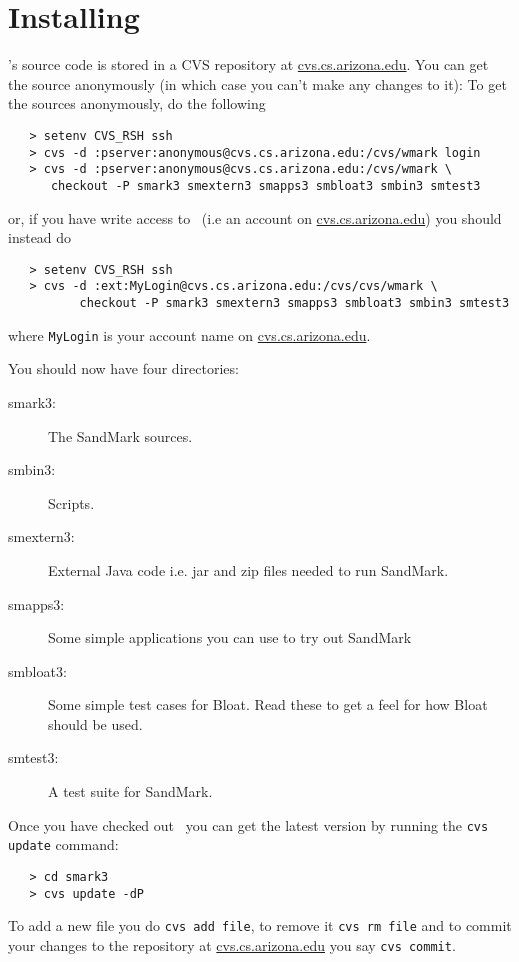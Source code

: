 \section{Installing \SM}
\label{InstallationSection}
\SM's source code is stored in a CVS repository at
\url{cvs.cs.arizona.edu}. You can get the source
anonymously (in which case you can't make
any changes to it):
To get the sources anonymously, do the following
\begin{verbatim}
   > setenv CVS_RSH ssh
   > cvs -d :pserver:anonymous@cvs.cs.arizona.edu:/cvs/wmark login
   > cvs -d :pserver:anonymous@cvs.cs.arizona.edu:/cvs/wmark \
      checkout -P smark3 smextern3 smapps3 smbloat3 smbin3 smtest3
\end{verbatim}
or, if you have write access to \SM\ (i.e an account on 
\url{cvs.cs.arizona.edu}) you should instead do 
\begin{verbatim}
   > setenv CVS_RSH ssh
   > cvs -d :ext:MyLogin@cvs.cs.arizona.edu:/cvs/cvs/wmark \
          checkout -P smark3 smextern3 smapps3 smbloat3 smbin3 smtest3
\end{verbatim}
where {\tt MyLogin} is your account name on \url{cvs.cs.arizona.edu}.

You should now have four directories:
\begin{description}
  \item[smark3:]     The SandMark sources.
  \item[smbin3:]     Scripts.
  \item[smextern3:]  External Java code i.e. jar and zip files
                    needed to run SandMark.
  \item[smapps3:]    Some simple applications you can use to try
                    out SandMark
  \item[smbloat3:]   Some simple test cases for Bloat. Read these
                    to get a feel for how Bloat should be used.
  \item[smtest3:]    A test suite for SandMark.
\end{description}

Once you have checked out \SM\ you can get the latest
version by running the {\tt cvs update} command:
\begin{verbatim}
   > cd smark3
   > cvs update -dP
\end{verbatim}
To add a new file you do {\tt cvs add file}, to remove it
{\tt cvs rm file} and to commit your changes to the
repository at \url{cvs.cs.arizona.edu} you say 
{\tt cvs commit}.

